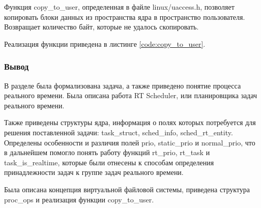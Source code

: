 Функция copy\_to\_user, определенная в файле linux/uaccess.h, позволяет копировать блоки данных из пространства ядра в пространство пользователя. Возвращает количество байт, которые не удалось скопировать. \cite{universityOfBirningham}

Реализация функции приведена в листинге \ref{code:copy_to_user}.


\subsubsection*{Вывод}
В разделе была формализована задача, а также приведено понятие процесса реального времени. Была описана работа RT Scheduler, или планировщика задач реального времени. 

Также приведены структуры ядра, информация о полях которых потребуется для решения поставленной задачи: task\_struct, sched\_info, sched\_rt\_entity. Определены особенности и различия полей prio, static\_prio и normal\_prio, что в дальнейшем помогло понять работу функций rt\_prio, rt\_task и task\_is\_realtime, которые были отнесены к способам определения принадлежности задач к группе задач реального времени.

Была описана концепция виртуальной файловой системы, приведена структура proc\_ops и реализация функции copy\_to\_user.

\pagebreak